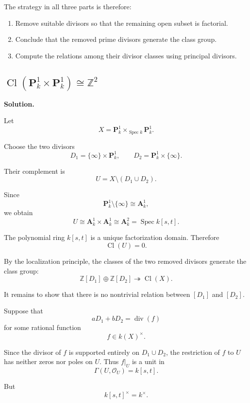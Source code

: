 The strategy in all three parts is therefore:

\begin{enumerate}[label=\arabic*.]
	\item Remove suitable divisors so that the remaining open subset is factorial.
	\item Conclude that the removed prime divisors generate the class group.
	\item Compute the relations among their divisor classes using principal divisors.
\end{enumerate}

\subsection{\texorpdfstring{\(\operatorname{Cl}(\mathbf{P}^1_k\times \mathbf{P}^1_k)\cong \mathbb{Z}^2\)}{Cl(P1 x P1) = Z2}}

\textbf{Solution.}

Let
\[
X=\mathbf{P}^1_k\times_{\operatorname{Spec} k}\mathbf{P}^1_k.
\]

Choose the two divisors
\[
D_1=\{\infty\}\times \mathbf{P}^1_k,
\qquad
D_2=\mathbf{P}^1_k\times \{\infty\}.
\]

Their complement is
\[
U=X\setminus(D_1\cup D_2).
\]

Since
\[
\mathbf{P}^1_k\setminus\{\infty\}\cong \mathbf{A}^1_k,
\]
we obtain
\[
U
\cong
\mathbf{A}^1_k\times \mathbf{A}^1_k
\cong
\mathbf{A}^2_k
=
\operatorname{Spec} k[s,t].
\]

The polynomial ring \(k[s,t]\) is a unique factorization domain. Therefore
\[
\operatorname{Cl}(U)=0.
\]

By the localization principle, the classes of the two removed divisors generate the class group:
\[
\mathbb{Z}[D_1]\oplus \mathbb{Z}[D_2]
\twoheadrightarrow
\operatorname{Cl}(X).
\]

It remains to show that there is no nontrivial relation between \([D_1]\) and \([D_2]\).

Suppose that
\[
aD_1+bD_2=\operatorname{div}(f)
\]
for some rational function
\[
f\in k(X)^\times.
\]

Since the divisor of \(f\) is supported entirely on \(D_1\cup D_2\), the restriction of \(f\) to \(U\) has neither zeros nor poles on \(U\). Thus \(f|_U\) is a unit in
\[
\Gamma(U,\mathcal{O}_U)=k[s,t].
\]

But
\[
k[s,t]^\times=k^\times.
\]

